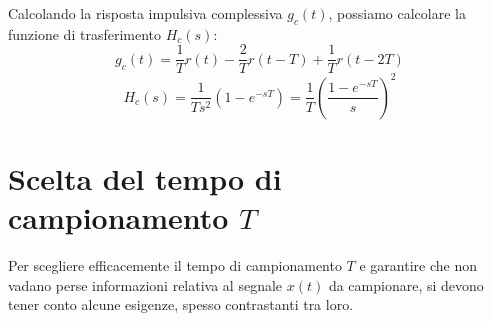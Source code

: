 \documentclass[a4paper]{report}
\begin{document}
Calcolando la risposta impulsiva complessiva $g_c(t)$, possiamo
calcolare la funzione di trasferimento $H_c(s)$:
\begin{equation}
  g_c(t) = \dfrac{1}{T} r(t) - \dfrac{2}{T}r(t - T) + \dfrac{1}{T}r(t
  - 2T)
\end{equation}
\begin{equation}
  H_c(s) = \dfrac{1}{T s^2}(1 - e^{-sT}) = \dfrac{1}{T}\left( \dfrac{1
  - e^{-sT}}{s}\right)^2
\end{equation}

\section{Scelta del tempo di campionamento $T$}
Per scegliere efficacemente il tempo di campionamento $T$ e garantire
che non vadano perse informazioni relativa al segnale $x(t)$ da
campionare, si devono tener conto alcune esigenze, spesso contrastanti
tra loro.
\end{document}
